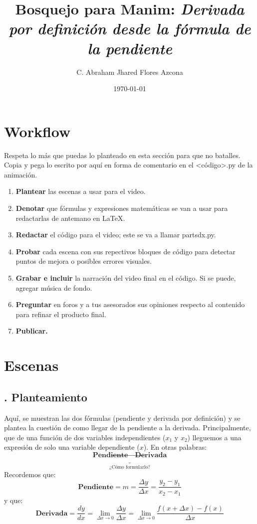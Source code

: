 \documentclass[letterpaper, 12pt]{article}
\title{Bosquejo para \textbf{Manim:} 
    {\fontfamily{qag}\selectfont
        \emph{Derivada por definición desde la fórmula de la pendiente}
    }
}
\author{C. Abraham Jhared Flores Azcona}
\date{\today}
\begin{document}
\maketitle
\thispagestyle{empty}
\section*{Workflow}
\justify
Respeta lo más que puedas lo planteado en esta sección para que no batalles. Copia y pega lo escrito por aquí en forma de comentario en el {\selectfont<código>.py} de la animación.
    \begin{enumerate}
        \item \textbf{Plantear} las escenas a usar para el video.
        \item \textbf{Denotar} que fórmulas y expresiones matemáticas se van a usar para redactarlas de antemano en \LaTeX.
        \item \textbf{Redactar} el código para el video; este se va a llamar {\selectfont partsdx.py}.
        \item \textbf{Probar} cada escena con sus repectivos bloques de código para detectar puntos de mejora o posibles errores visuales.
        \item \textbf{Grabar e incluir} la narración del video final en el código. Si se puede, agregar música de fondo.
        \item \textbf{Preguntar} en foros y a tus asesorados sus opiniones respecto al contenido para refinar el producto final.
        \item \textbf{Publicar.}
    \end{enumerate}

\section*{Escenas}
\subsection*{{. Planteamiento}} \justify
Aquí, se muestran las dos fórmulas (pendiente y derivada por definición) y se plantea la cuestión de como llegar de la pendiente a la derivada. Principalmente, que de una función de dos variables 
independientes (\(x_1\) y \(x_2\)) lleguemos a una expresión de solo una variable dependiente (\(x\)). En otras palabras:
\[\underbrace{\textbf{ Pendiente}\rightarrow \textbf{Derivada }}_{\text{¿Cómo formularlo?}} \]
Recordemos que:
\[\textbf{Pendiente}=m=\frac{\Delta y}{\Delta x}=\frac{y_2-y_1}{x_2-x_1}\]
y que:
\[\textbf{Derivada}=\frac{dy}{dx}=\lim_{\Delta x\rightarrow 0}\frac{\Delta y}{\Delta x}=\lim_{\Delta x\rightarrow 0}\frac{f(x+\Delta x)-f(x)}{\Delta x}\]
\end{document}
